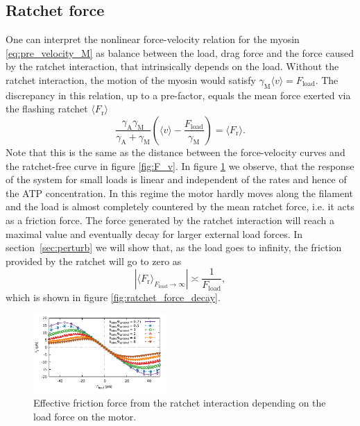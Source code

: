 \documentclass[aps,pre,twocolumn,showpacs,showkeys,superscriptaddress,floatfix]{revtex4-1}
\begin{document}
\subsection{Ratchet force} 
One can interpret the nonlinear force-velocity relation for the myosin \eqref{eq:pre_velocity_M} as balance between the load, drag force and the force caused by the ratchet interaction, 
that intrinsically depends on the load. 
Without the ratchet interaction, the motion of the myosin would satisfy $ \gamma_\text{M}\langle v\rangle = F_\text{load}$. 
The discrepancy in this relation, up to a pre-factor, equals the mean force exerted via the flashing ratchet $\langle F_\text{r}\rangle$ 
\begin{equation}
\frac{\gamma_\text{A}\gamma_\text{M}}{\gamma_\text{A} + \gamma_\text{M} } \left(\langle v \rangle - \frac{F_\text{load}}{\gamma_\text{M}}\right) = \langle F_\text{r} \rangle.
\label{eq:mean_ratchet_force}
\end{equation}
Note that this is the same as the distance between the force-velocity curves and the ratchet-free curve in figure \ref{fig:F_v}.
In figure \ref{fig:ratchet_force} we observe, 
that the response of the system for small loads is linear and independent of the rates and hence of the ATP concentration. 
In this regime the motor hardly moves along the filament and the load is almost completely countered by the mean ratchet force, i.e. it acts as a friction force.
The force generated by the ratchet interaction will reach a maximal value and eventually decay for larger external load forces. 
In section~\ref{sec:perturb} we will show that, as the load goes to infinity, the friction provided by the ratchet will go to zero as 
\begin{equation}
\left| \langle F_\text{r} \rangle_{F_\text{load}\rightarrow\infty} \right| \asymp \frac{1}{F_\text{load}} , 
\label{eq:ratchet_vs_load}
\end{equation} 
which is shown in figure \ref{fig:ratchet_force_decay}. 
\begin{figure}[t]
\centering
\includegraphics[width=0.45\textwidth,height=!]{ratchet_force}
\caption{
\label{fig:ratchet_force}
Effective friction force from the ratchet interaction depending on the load force on the motor.
}
\end{figure}
\end{document}
